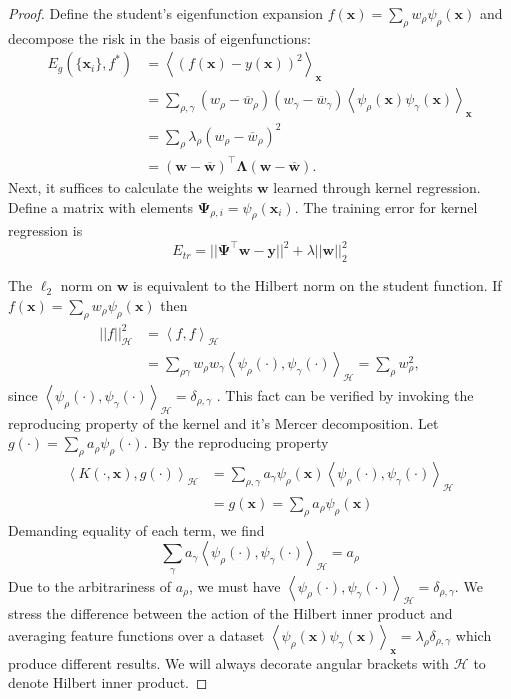 \documentclass{article}
\begin{document}
\begin{proof}
Define the student's eigenfunction expansion $f(\mathbf{x}) = \sum_\rho w_\rho \psi_\rho(\mathbf{x})$ and decompose the risk in the basis of eigenfunctions:
\begin{align}
E_g(\{\mathbf{x}_i\}, f^*)& = \left< (f( \mathbf{x} )- y(\mathbf{x}))^2 \right>_{\mathbf{x}} \nonumber
\\
&= \sum_{\rho,\gamma} (w_\rho - \overline{w}_\rho) (w_\gamma - \overline{w}_\gamma) \left< \psi_\rho(\mathbf{x}) \psi_\gamma(\mathbf{x}) \right>_{\mathbf{x}} \nonumber
\\
&= \sum_{\rho} \lambda_\rho (w_\rho - \overline{w}_\rho)^2 \nonumber
\\
&= (\mathbf{w} - \mathbf{\overline{w}})^\top \mathbf{\Lambda} (\mathbf{w} - \mathbf{\overline{w}}).
\end{align}
%
Next, it suffices to calculate the weights $\mathbf{w}$ learned through kernel regression. Define a matrix with elements $\mathbf{\Psi}_{\rho, i} = \psi_\rho(\mathbf{x}_i)$. The training error for kernel regression is
\begin{equation}
    E_{tr} = ||\mathbf{\Psi}^\top \mathbf{w} - \mathbf{y}||^2 + \lambda ||\mathbf{w}||_2^2
\end{equation}

The $\ell_2$ norm on $\mathbf{w}$ is equivalent to the Hilbert norm on the student function. If $f(\mathbf{x}) = \sum_\rho w_\rho \psi_\rho(\mathbf{x})$ then
\begin{align}
    \nonumber
    ||f||^2_{\mathcal{H}} &= \left< f, f \right>_{\mathcal{H}}
    \\
    &= \sum_{\rho \gamma} w_\rho w_\gamma \left< \psi_\rho(\cdot), \psi_\gamma(\cdot) \right>_{\mathcal{H}} = \sum_\rho w_\rho^2,
\end{align}
since $\left< \psi_\rho(\cdot), \psi_\gamma(\cdot) \right>_{\mathcal{H}} = \delta_{\rho,\gamma}$ \cite{bietti2019inductive}. This fact can be verified by invoking the reproducing property of the kernel and it's Mercer decomposition. Let $g(\cdot) = \sum_{\rho} a_\rho \psi_\rho(\cdot)$. By the reproducing property
\begin{align}
    \left< K(\cdot, \mathbf{x}), g(\cdot) \right>_{\mathcal{H}} &= \sum_{\rho,\gamma} a_\gamma \psi_\rho(\mathbf{x}) \left< \psi_\rho(\cdot),\psi_\gamma(\cdot) \right>_{\mathcal{H}}\nonumber
    \\
    &= g(\mathbf{x}) =  \sum_\rho a_\rho \psi_\rho(\mathbf{x})
\end{align}
Demanding equality of each term, we find
\begin{equation}
    \sum_\gamma a_\gamma \left< \psi_\rho(\cdot),\psi_\gamma(\cdot) \right>_{\mathcal{H}} = a_\rho
\end{equation}
Due to the arbitrariness of $a_\rho$, we must have $\left< \psi_\rho(\cdot), \psi_\gamma(\cdot) \right>_{\mathcal{H}} = \delta_{\rho,\gamma}$. We stress the difference between the action of the Hilbert inner product and averaging feature functions over a dataset $\left< \psi_\rho(\mathbf{x}) \psi_\gamma(\mathbf{x}) \right>_{\mathbf{x}} = \lambda_\rho \delta_{\rho,\gamma}$ which produce different results. We will always decorate angular brackets with $\mathcal{H}$ to denote Hilbert inner product.


\end{proof}
\end{document}
